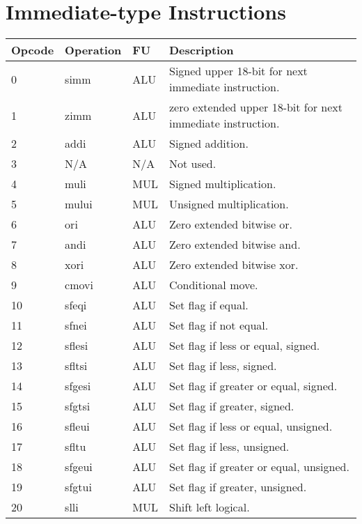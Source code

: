 \section{Immediate-type Instructions}\label{appendix:i_type_instrs}
\begin{table}[h]
\begin{center}
\begin{tabular}{@{}p{}p{}p{}p{}@{}}
\toprule
\textbf{Opcode} & \textbf{Operation} & \textbf{FU} & \textbf{Description}\\ \hline
0 & simm & ALU	& Signed upper 18-bit for next immediate instruction. \\ 
1 & zimm & ALU	& zero extended upper 18-bit for next immediate instruction. \\ 
2 & addi & ALU	& Signed addition. \\ 
3 & N/A & N/A		& Not used. \\ 
4 & muli & MUL	& Signed multiplication. \\ 
5 & mului & MUL	& Unsigned multiplication. \\ 
6 & ori & ALU		& Zero extended bitwise or. \\ 
7 & andi & ALU	& Zero extended bitwise and. \\ 
8 & xori & ALU	& Zero extended bitwise xor. \\ 
9 & cmovi & ALU	& Conditional move. \\ 
10 & sfeqi & ALU	& Set flag if equal. \\ 
11 & sfnei & ALU	& Set flag if not equal. \\ 
12 & sflesi & ALU	& Set flag if less or equal, signed. \\ 
13 & sfltsi & ALU	& Set flag if less, signed. \\ 
14 & sfgesi & ALU	& Set flag if greater or equal, signed. \\ 
15 & sfgtsi & ALU	& Set flag if greater, signed. \\ 
16 & sfleui & ALU	& Set flag if less or equal, unsigned. \\ 
17 & sfltu & ALU	& Set flag if less, unsigned. \\ 
18 & sfgeui & ALU	& Set flag if greater or equal, unsigned. \\ 
19 & sfgtui & ALU	& Set flag if greater, unsigned. \\ 
20 & slli & MUL	& Shift left logical. \\ 

\end{tabular}
\end{center}
\end{table}

